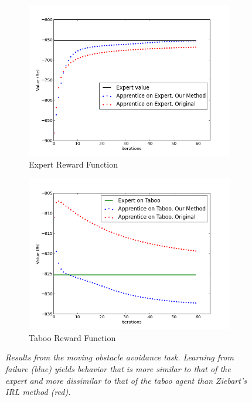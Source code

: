 \documentclass[conference]{IEEEtran}
\begin{document}
\begin{figure}[t]
  \hspace{-5pt}
  \begin{subfigure}{0.22\textwidth}

    \includegraphics[scale = 0.22]{figures/resa.png}
    \caption{Expert Reward Function}
    \label{fig:res_a}
  \end{subfigure}
  \hspace{25pt}
  \begin{subfigure}{0.22\textwidth}
	  
    \includegraphics[scale = 0.22]{figures/resb.png}
        \caption{Taboo Reward Function}
    \label{fig:res_b}
\end{subfigure}
  \caption{\small{\textit{Results from the moving obstacle avoidance task.  Learning from failure (blue) yields behavior that is more similar to that of the expert and more dissimilar to that of the taboo agent than Ziebart's IRL method (red).}} }
  \label{fig:res}
\vspace{-4mm}
\end{figure}
\end{document}
